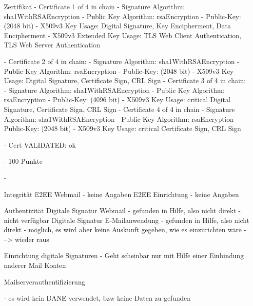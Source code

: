 \documentclass  [paper=a4,
				fontsize=12pt,
				listof=totoc,
				bibliography=totoc
				]{scrreprt}
\begin{document}
			
			Zertifikat
			- Certificate 1 of 4 in chain
				- Signature Algorithm: sha1WithRSAEncryption
				- Public Key Algorithm: rsaEncryption
				- Public-Key: (2048 bit)
				-  X509v3 Key Usage: 
				        Digital Signature, Key Encipherment, Data Encipherment
				- X509v3 Extended Key Usage: 
				        TLS Web Client Authentication, TLS Web Server Authentication
					
			- Certificate 2 of 4 in chain:
				- Signature Algorithm: sha1WithRSAEncryption
				- Public Key Algorithm: rsaEncryption
				- Public-Key: (2048 bit)
				- X509v3 Key Usage: 
				        Digital Signature, Certificate Sign, CRL Sign
			- Certificate 3 of 4 in chain:
				- Signature Algorithm: sha1WithRSAEncryption
				- Public Key Algorithm: rsaEncryption
				- Public-Key: (4096 bit)
				- X509v3 Key Usage: critical
				        Digital Signature, Certificate Sign, CRL Sign
			- Certificate 4 of 4 in chain
				- Signature Algorithm: sha1WithRSAEncryption
				- Public Key Algorithm: rsaEncryption
				- Public-Key: (2048 bit)
			- X509v3 Key Usage: critical
			        Certificate Sign, CRL Sign
			        
			        
			-  	Cert VALIDATED: ok
			
			- 100 Punkte
			
			- 
			\medskip
			
			Integrität
			E2EE Webmail
			- keine Angaben
			E2EE Einrichtung
			- keine Angaben
			\medskip
			
			
			Authentizität
			Digitale Signatur Webmail
			- gefunden in Hilfe, also nicht direkt
			- nicht verfügbar %
			Digitale Signatur E-Mailanwendung
			- gefunden in Hilfe, also nicht direkt
			- möglich, es wird aber keine Auskunft gegeben, wie es einzurichten wäre
			- --> wieder raus
			
			Einrichtung digitale Signaturen
			- Geht scheinbar nur mit Hilfe einer Einbindung anderer Mail Konten
			
			
			Mailserverauthentifizierung
			
			- es wird kein DANE verwendet, bzw keine Daten zu gefunden
			\medskip
			
\end{document}
